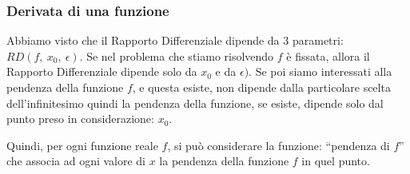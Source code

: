% 

\subsubsection{Derivata di una funzione}
\label{subsec:differenziazione_derivatafunzione}
Abbiamo visto che il Rapporto Differenziale dipende da \(3\) parametri:
\(RD(f,~x_0,~\epsilon)\). 
Se nel problema che stiamo risolvendo \(f\) è fissata, allora il Rapporto 
Differenziale dipende solo da \(x_0\) e da \(\epsilon)\). 
Se poi siamo interessati alla pendenza della funzione \(f\), 
e questa esiste, non dipende dalla particolare scelta dell'infinitesimo 
quindi la pendenza della funzione, se esiste, dipende solo dal punto preso 
in considerazione: \(x_0\).

Quindi, per ogni funzione reale \(f\), si può considerare la funzione: 
``pendenza di \(f\)'' che associa ad ogni valore di \(x\) la pendenza 
della funzione \(f\) in quel punto. 

